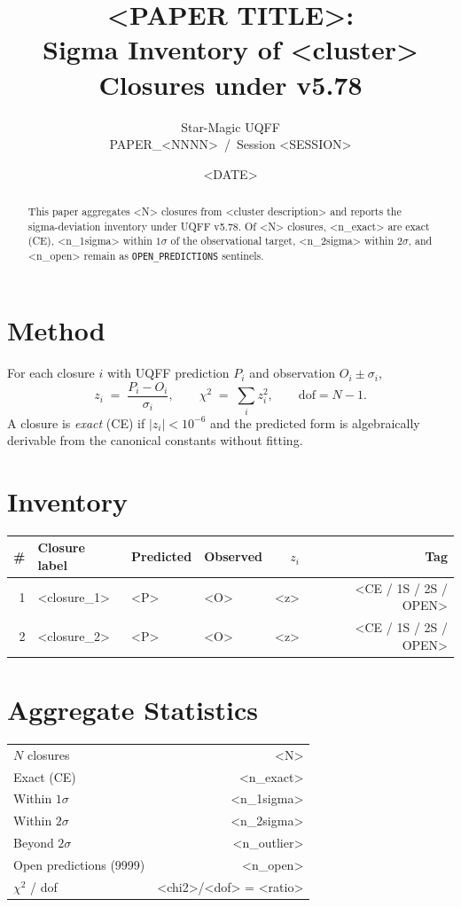 \documentclass[11pt]{article}
\title{<PAPER TITLE>: \\ Sigma Inventory of <cluster> Closures under v5.78}
\author{Star-Magic UQFF \\ PAPER\_<NNNN> \,/\, Session <SESSION>}
\date{<DATE>}
\begin{document}
\maketitle

\begin{abstract}
This paper aggregates <N> closures from <cluster description> and reports
the sigma-deviation inventory under UQFF v5.78. Of <N> closures,
<n_exact> are exact (CE), <n_1sigma> within $1\sigma$ of the observational
target, <n_2sigma> within $2\sigma$, and <n_open> remain as
\texttt{OPEN\_PREDICTIONS} sentinels.
\end{abstract}

\section{Method}
For each closure $i$ with UQFF prediction $P_i$ and observation $O_i\pm\sigma_i$,
\begin{equation}
  z_i \;=\; \frac{P_i - O_i}{\sigma_i}, \qquad \chi^2 \;=\; \sum_i z_i^{2}, \qquad
  \mathrm{dof} = N - 1 .
\end{equation}
A closure is \emph{exact} (CE) if $|z_i|<10^{-6}$ and the predicted form is
algebraically derivable from the canonical constants without fitting.

\section{Inventory}
\begin{longtable}{rlllrr}
\toprule
\# & Closure label & Predicted & Observed & $z_i$ & Tag \\
\midrule
1  & <closure_1>   & <P>       & <O>      & <z>   & <CE / 1S / 2S / OPEN> \\
2  & <closure_2>   & <P>       & <O>      & <z>   & <CE / 1S / 2S / OPEN> \\
\bottomrule
\end{longtable}

\section{Aggregate Statistics}
\begin{center}
\begin{tabular}{lr}
\toprule
$N$ closures            & <N> \\
Exact (CE)              & <n_exact> \\
Within $1\sigma$        & <n_1sigma> \\
Within $2\sigma$        & <n_2sigma> \\
Beyond $2\sigma$        & <n_outlier> \\
Open predictions (9999) & <n_open> \\
$\chi^2$ / dof          & <chi2>/<dof> = <ratio> \\
\bottomrule
\end{tabular}
\end{center}
\end{document}
